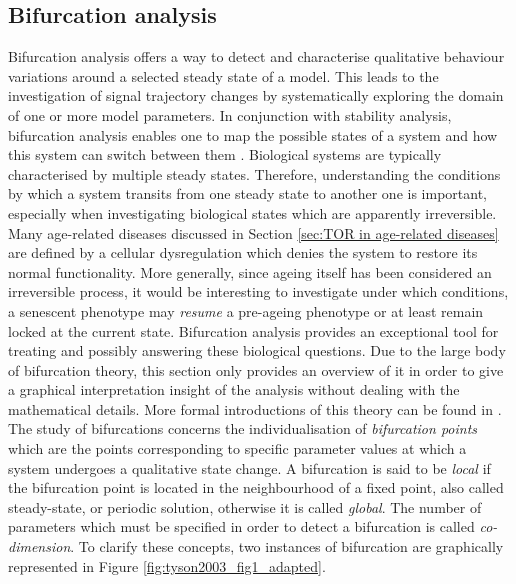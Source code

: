 \subsection{Bifurcation analysis} 
\label{subsec:Bifurcation analysis}
Bifurcation analysis offers a way to detect and characterise qualitative behaviour variations around a selected steady state of a model. This leads to the investigation of signal trajectory changes by systematically exploring the domain of one or more model parameters. In conjunction with stability analysis, bifurcation analysis enables one to map the possible states of a system and how this system can switch between them \citep{Aldridge2006}. 
Biological systems are typically characterised by multiple steady states. Therefore, understanding the conditions by which a system transits from one steady state to another one is important, especially when investigating biological states which are apparently irreversible. Many age-related diseases discussed in Section \ref{sec:TOR in age-related diseases} are defined by a cellular dysregulation which denies the system to restore its normal functionality. More generally, since ageing itself has been considered an irreversible process, it would be interesting to investigate under which conditions, a senescent phenotype may \emph{resume} a pre-ageing phenotype or at least remain locked at the current state. Bifurcation analysis provides an exceptional tool for treating and possibly answering these biological questions. Due to the large body of bifurcation theory, this section only provides an overview of it in order to give a graphical interpretation insight of the analysis without dealing with the 
mathematical details. More formal introductions of this theory can be found in \citep{borisuk1997, Hirsch2004}.\\ 
The study of bifurcations concerns the individualisation of \emph{bifurcation points} which are the points corresponding to specific parameter values at which a system undergoes a qualitative state change. A bifurcation is said to be \emph{local} if the bifurcation point is located in the neighbourhood of a fixed point, also called steady-state, or periodic solution, otherwise it is called \emph{global}. The number of parameters which must be specified in order to detect a bifurcation is called \emph{co-dimension}. To clarify these concepts, two instances of bifurcation are graphically represented in Figure \ref{fig:tyson2003_fig1_adapted}. \\
